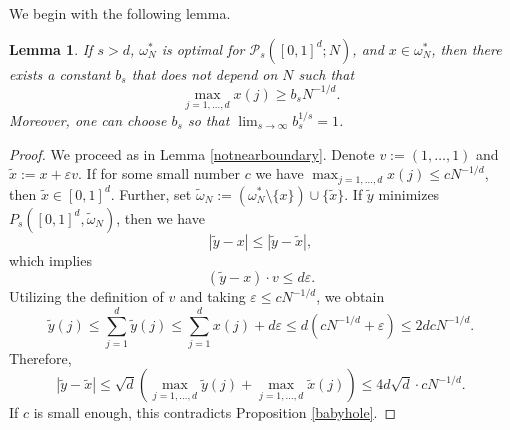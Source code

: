 \documentclass[12pt]{amsart}
\newtheorem{lemma}[theorem]{Lemma}
\theoremstyle{definition}
\def\sli{\sum\limits}
\def\ep{\varepsilon}
\newcommand{\1}{\mathbf{1}}
\newcommand{\PP}{\mathcal{P}}
\begin{document}
We begin with the following lemma.
\begin{lemma}\label{noangle}
If $s>d$, $\omega^*_N$ is optimal for $\PP_s([0,1]^d; N)$, and $x\in \omega^*_N$, then there exists a constant $b_s$ that does not depend on $N$ such that
$$
\max_{j=1, \ldots, d}x(j)\geqslant b_s N^{-1/d}.
$$
Moreover, one can choose $b_s$ so that $\lim_{s\to \infty} b_s^{1/s}=1$. 
\end{lemma}
\begin{proof}
We proceed as in Lemma \ref{notnearboundary}. Denote $v:=(1, \ldots, 1)$ and $\tilde{x}:=x+\ep v$. If for some small number $c$ we have $\max_{j=1,\ldots, d}x(j) \leqslant cN^{-1/d}$, then $\tilde{x}\in [0,1]^d$. Further, set $\widetilde{\omega}_N:=(\omega^*_N\setminus \{x\})\cup \{\tilde{x}\}$. If $\tilde{y}$ minimizes $P_s([0,1]^d, \widetilde\omega_N)$, then we have
$$
|\tilde{y}-x|\leqslant |\tilde{y}-\tilde{x}|,
$$
which implies
$$
(\tilde{y}-x)\cdot v \leqslant d\ep.
$$
Utilizing the definition of $v$ and taking $\ep\leqslant cN^{-1/d}$, we obtain
$$
\tilde y(j)\leqslant \sli_{j=1}^d \tilde y(j) \leqslant \sli_{j=1}^d x(j) + d\ep \leqslant d(cN^{-1/d}+\ep) \leqslant 2dcN^{-1/d}.
$$
Therefore,
$$
|\tilde{y}-\tilde{x}|\leqslant \sqrt{d}(\max_{j=1,\ldots, d}\tilde{y}(j)+\max_{j=1,\ldots, d}\tilde{x}(j)) \leqslant 4d\sqrt{d}\cdot cN^{-1/d}.
$$
If $c$ is small enough, this contradicts Proposition \ref{babyhole}.
\end{proof}
\end{document}
